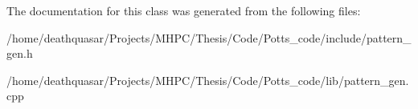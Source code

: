 The documentation for this class was generated from the following files\+:\begin{DoxyCompactItemize}
\item 
/home/deathquasar/\+Projects/\+M\+H\+P\+C/\+Thesis/\+Code/\+Potts\+\_\+code/include/pattern\+\_\+gen.\+h\item 
/home/deathquasar/\+Projects/\+M\+H\+P\+C/\+Thesis/\+Code/\+Potts\+\_\+code/lib/pattern\+\_\+gen.\+cpp\end{DoxyCompactItemize}
